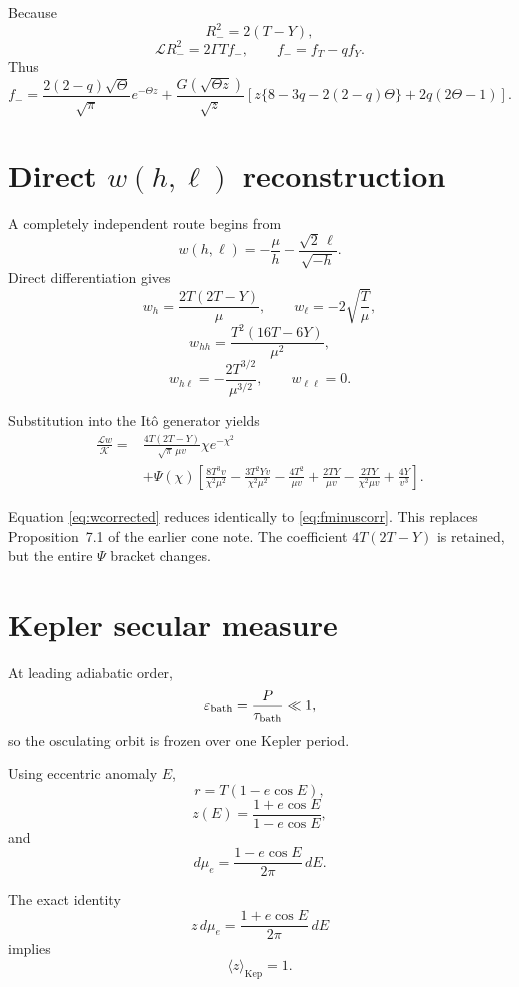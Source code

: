 \documentclass[11pt]{article}
\theoremstyle{remark}
\newcommand{\Kep}{\mathrm{Kep}}
\newcommand{\1}{\mathbf 1}
\begin{document}
Because
\[
R_-^2=2(T-Y),
\]
\[
\mathcal LR_-^2
=
2\Gamma T f_-,
\qquad
f_-=f_T-qf_Y.
\]
Thus
\begin{equation}
\boxed{
f_-
=
\frac{2(2-q)\sqrt\Theta}{\sqrt\pi}e^{-\Theta z}
+
\frac{G(\sqrt{\Theta z})}{\sqrt z}
\left[
z\{8-3q-2(2-q)\Theta\}
+
2q(2\Theta-1)
\right].
}
\label{eq:fminuscorr}
\end{equation}

\section{Direct $w(h,\ell)$ reconstruction}

A completely independent route begins from
\[
w(h,\ell)
=
-\frac{\mu}{h}
-\frac{\sqrt2\,\ell}{\sqrt{-h}}.
\]
Direct differentiation gives
\[
w_h=\frac{2T(2T-Y)}{\mu},
\qquad
w_\ell=-2\sqrt{\frac{T}{\mu}},
\]
\[
w_{hh}
=
\frac{T^2(16T-6Y)}{\mu^2},
\]
\[
w_{h\ell}
=
-\frac{2T^{3/2}}{\mu^{3/2}},
\qquad
w_{\ell\ell}=0.
\]

Substitution into the It\^o generator yields
\begin{equation}
\boxed{
\begin{aligned}
\frac{\mathcal Lw}{\mathcal K}
={}&
\frac{4T(2T-Y)}
{\sqrt\pi\,\mu v}
\chi e^{-\chi^2}
\\
&+
\Psi(\chi)
\left[
\frac{8T^3v}{\chi^2\mu^2}
-\frac{3T^2Yv}{\chi^2\mu^2}
-\frac{4T^2}{\mu v}
+\frac{2TY}{\mu v}
-\frac{2TY}{\chi^2\mu v}
+\frac{4Y}{v^3}
\right].
\end{aligned}
}
\label{eq:wcorrected}
\end{equation}

Equation \eqref{eq:wcorrected} reduces identically to
\eqref{eq:fminuscorr}.  This replaces Proposition~7.1 of the earlier cone
note.  The coefficient $4T(2T-Y)$ is retained, but the entire
$\Psi$ bracket changes.

\section{Kepler secular measure}

At leading adiabatic order,
\[
\varepsilon_{\rm bath}
=
\frac{P}{\tau_{\rm bath}}\ll1,
\]
so the osculating orbit is frozen over one Kepler period.

Using eccentric anomaly $E$,
\[
r=T(1-e\cos E),
\]
\[
z(E)
=
\frac{1+e\cos E}{1-e\cos E},
\]
and
\[
\boxed{
d\mu_e
=
\frac{1-e\cos E}{2\pi}\,dE.
}
\]

The exact identity
\[
z\,d\mu_e
=
\frac{1+e\cos E}{2\pi}\,dE
\]
implies
\[
\boxed{
\langle z\rangle_{\Kep}=1.
}
\]
\end{document}
